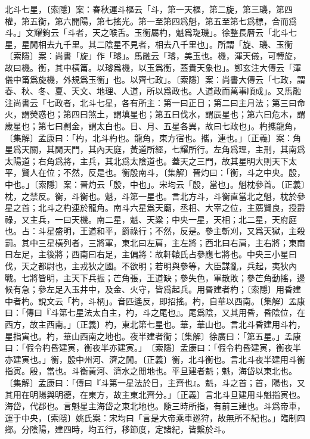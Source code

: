北斗七星，〔索隱〕案：春秋運斗樞云「斗，第一天樞，第二旋，第三璣，第四權，第五衡，第六開陽，第七搖光。第一至第四爲魁，第五至第七爲標，合而爲斗。」文耀鉤云「斗者，天之喉舌。玉衡屬杓，魁爲琁璣」。徐整長曆云「北斗七星，星閒相去九千里。其二陰星不見者，相去八千里也」。所謂「旋、璣、玉衡〔索隱〕案：尚書「旋」作「璿」。馬融云「璿，美玉也。機，渾天儀，可轉旋，故曰機。衡，其中橫筩。以璿爲機，以玉爲衡，蓋貴天象也」。鄭玄注大傳云「渾儀中筩爲旋機，外規爲玉衡」也。以齊七政」。〔索隱〕案：尚書大傳云「七政，謂春、秋、冬、夏、天文、地理、人道，所以爲政也。人道政而萬事順成」。又馬融注尚書云「七政者，北斗七星，各有所主：第一曰正日；第二曰主月法；第三曰命火，謂熒惑也；第四曰煞土，謂填星也；第五曰伐水，謂辰星也；第六曰危木，謂歲星也；第七曰剽金，謂太白也。日、月、五星各異，故曰七政也」。杓攜龍角，〔集解〕孟康曰：「杓，北斗杓也。龍角，東方宿也。攜，連也。」〔正義〕案：角星爲天關，其閒天門，其內天庭，黃道所經，七耀所行。左角爲理，主刑，其南爲太陽道；右角爲將，主兵，其北爲太陰道也。蓋天之三門，故其星明大則天下太平，賢人在位；不然，反是也。衡殷南斗，〔集解〕晉灼曰：「衡，斗之中央。殷，中也。」〔索隱〕案：晉灼云「殷，中也」。宋均云「殷，當也」。魁枕參首。〔正義〕枕，之禁反。衡，斗衡也。魁，斗第一星也。言北方斗，斗衡直當北之魁，枕於參星之首；北斗之杓連於龍角。南斗六星爲天廟，丞相、大宰之位，主薦賢良，授爵祿，又主兵，一曰天機。南二星，魁、天粱；中央一星，天相；北二星，天府庭也。占：斗星盛明，王道和平，爵祿行；不然，反是。參主斬刈，又爲天獄，主殺罰。其中三星橫列者，三將軍，東北曰左肩，主左將；西北曰右肩，主右將；東南曰左足，主後將；西南曰右足，主偏將：故軒轅氏占參應七將也。中央三小星曰伐，天之都尉也，主戎狄之國。不欲明；若明與參等，大臣謀亂，兵起，夷狄內戰。七將皆明，主天下兵振；芒角張，王道缺；參失色，軍散敗；參芒角動搖，邊候有急；參左足入玉井中，及金、火守，皆爲起兵。用昬建者杓；〔索隱〕用昏建中者杓。說文云「杓，斗柄」。音匹遙反，即招搖。杓，自華以西南。〔集解〕孟康曰：「傳曰『斗第七星法太白主，杓，斗之尾也』。尾爲陰，又其用昏，昏陰位，在西方，故主西南。」〔正義〕杓，東北第七星也。華，華山也。言北斗昏建用斗杓，星指寅也。杓，華山西南之地也。夜半建者衡；〔集解〕徐廣曰：「第五星。」孟康曰：「假令杓昏建寅，衡夜半亦建寅。」　〔索隱〕孟康曰：「假令杓昏建寅，衡夜半亦建寅也。」衡，殷中州河、濟之閒。〔正義〕衡，北斗衡也。言北斗夜半建用斗衡指寅。殷，當也。斗衡黃河、濟水之閒地也。平旦建者魁；魁，海岱以東北也。〔集解〕孟康曰：「傳曰『斗第一星法於日，主齊也』。魁，斗之首；首，陽也，又其用在明陽與明德，在東方，故主東北齊分。」〔正義〕言北斗旦建用斗魁指寅也。海岱，代郡也。言魁星主海岱之東北地也。隨三時所指，有前三建也。斗爲帝車，運于中央，〔索隱〕姚氏案：宋均曰「言是大帝乘車廵狩，故無所不紀也。」臨制四鄉。分陰陽，建四時，均五行，移節度，定諸紀，皆繫於斗。

